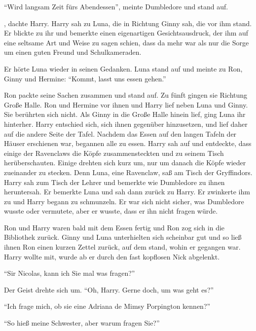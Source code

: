 \enquote{Wird langsam Zeit fürs Abendessen}, meinte Dumbledore und stand auf.

, dachte Harry.  Harry sah zu Luna, die in Richtung Ginny sah, die vor ihm stand. Er blickte zu ihr und bemerkte einen eigenartigen Gesichtsausdruck, der ihm auf eine seltsame Art und Weise zu sagen schien, dass da mehr war als nur die Sorge um einen guten Freund und Schulkameraden.

Er hörte Luna wieder in seinen Gedanken.  Luna stand auf und meinte zu Ron, Ginny und Hermine: \enquote{Kommt, lasst uns essen gehen.}

Ron packte seine Sachen zusammen und stand auf. Zu fünft gingen sie Richtung Große Halle. Ron und Hermine vor ihnen und Harry lief neben Luna und Ginny. Sie berührten sich nicht. Als Ginny in die Große Halle hinein lief, ging Luna ihr hinterher. Harry entschied sich, sich ihnen gegenüber hinzusetzen, und lief daher auf die andere Seite der Tafel. Nachdem das Essen auf den langen Tafeln der Häuser erschienen war, begannen alle zu essen. Harry sah auf und entdeckte, dass einige der Ravenclaws die Köpfe zusammensteckten und zu seinem Tisch herüberschauten. Einige drehten sich kurz um, nur um danach die Köpfe wieder zueinander zu stecken.  Denn Luna, eine Ravenclaw, saß am Tisch der Gryffindors. Harry sah zum Tisch der Lehrer und bemerkte wie Dumbledore zu ihnen heruntersah. Er bemerkte Luna und sah dann zurück zu Harry. Er zwinkerte ihm zu und Harry begann zu schmunzeln. Er war sich nicht sicher, was Dumbledore wusste oder vermutete, aber er wusste, dass er ihn nicht fragen würde.

Ron und Harry waren bald mit dem Essen fertig und Ron zog sich in die Bibliothek zurück. Ginny und Luna unterhielten sich scheinbar gut und so ließ ihnen Ron einen kurzen Zettel zurück, auf dem stand, wohin er gegangen war. Harry wollte mit, wurde ab er durch den fast kopflosen Nick abgelenkt.

\enquote{Sir Nicolas, kann ich Sie mal was fragen?}

Der Geist drehte sich um. \enquote{Oh, Harry. Gerne doch, um was geht es?}

\enquote{Ich frage mich, ob sie eine Adriana de Mimsy Porpington kennen?}

\enquote{So hieß meine Schwester, aber warum fragen Sie?}

